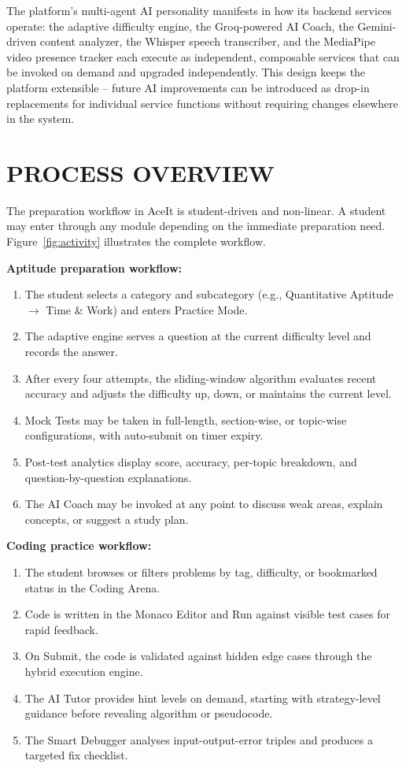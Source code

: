 \documentclass[12pt,a4paper]{report}
\begin{document}
The platform's multi-agent AI personality manifests in how its backend services operate: the adaptive difficulty engine, the Groq-powered AI Coach, the Gemini-driven content analyzer, the Whisper speech transcriber, and the MediaPipe video presence tracker each execute as independent, composable services that can be invoked on demand and upgraded independently. This design keeps the platform extensible -- future AI improvements can be introduced as drop-in replacements for individual service functions without requiring changes elsewhere in the system.

\section{PROCESS OVERVIEW}

The preparation workflow in AceIt is student-driven and non-linear. A student may enter through any module depending on the immediate preparation need. Figure~\ref{fig:activity} illustrates the complete workflow.

\textbf{Aptitude preparation workflow:}
\begin{enumerate}[leftmargin=0.5in, label=\arabic*., topsep=4pt, itemsep=2pt]
    \item The student selects a category and subcategory (e.g., Quantitative Aptitude $\to$ Time \& Work) and enters Practice Mode.
    \item The adaptive engine serves a question at the current difficulty level and records the answer.
    \item After every four attempts, the sliding-window algorithm evaluates recent accuracy and adjusts the difficulty up, down, or maintains the current level.
    \item Mock Tests may be taken in full-length, section-wise, or topic-wise configurations, with auto-submit on timer expiry.
    \item Post-test analytics display score, accuracy, per-topic breakdown, and question-by-question explanations.
    \item The AI Coach may be invoked at any point to discuss weak areas, explain concepts, or suggest a study plan.
\end{enumerate}

\textbf{Coding practice workflow:}
\begin{enumerate}[leftmargin=0.5in, label=\arabic*., topsep=4pt, itemsep=2pt]
    \item The student browses or filters problems by tag, difficulty, or bookmarked status in the Coding Arena.
    \item Code is written in the Monaco Editor and Run against visible test cases for rapid feedback.
    \item On Submit, the code is validated against hidden edge cases through the hybrid execution engine.
    \item The AI Tutor provides hint levels on demand, starting with strategy-level guidance before revealing algorithm or pseudocode.
    \item The Smart Debugger analyses input-output-error triples and produces a targeted fix checklist.
\end{enumerate}
\end{document}
